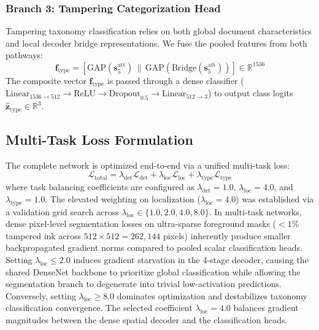 \documentclass[pdflatex,sn-mathphys-num,iicol]{sn-jnl}
\begin{document}
\subsubsection{Branch 3: Tampering Categorization Head}
Tampering taxonomy classification relies on both global document characteristics and local decoder bridge representations. We fuse the pooled features from both pathways:
\begin{equation}
\mathbf{f}_{\text{type}} = [\text{GAP}(\mathbf{s}_5^{\text{att}}) \,\|\, \text{GAP}(\text{Bridge}(\mathbf{s}_5^{\text{att}}))] \in \mathbb{R}^{1536}\label{eq_type_feat}
\end{equation}
The composite vector $\mathbf{f}_{\text{type}}$ is passed through a dense classifier ($\text{Linear}_{1536 \rightarrow 512} \rightarrow \text{ReLU} \rightarrow \text{Dropout}_{0.5} \rightarrow \text{Linear}_{512 \rightarrow 3}$) to output class logits $\hat{\mathbf{z}}_{\text{type}} \in \mathbb{R}^3$.

\subsection{Multi-Task Loss Formulation}\label{subsec4_5}
The complete network is optimized end-to-end via a unified multi-task loss:
\begin{equation}
\mathcal{L}_{\text{total}} = \lambda_{\text{det}} \mathcal{L}_{\text{det}} + \lambda_{\text{loc}} \mathcal{L}_{\text{loc}} + \lambda_{\text{type}} \mathcal{L}_{\text{type}}\label{eq_loss_total}
\end{equation}
where task balancing coefficients are configured as $\lambda_{\text{det}} = 1.0$, $\lambda_{\text{loc}} = 4.0$, and $\lambda_{\text{type}} = 1.0$. The elevated weighting on localization ($\lambda_{\text{loc}} = 4.0$) was established via a validation grid search across $\lambda_{\text{loc}} \in \{1.0, 2.0, 4.0, 8.0\}$. In multi-task networks, dense pixel-level segmentation losses on ultra-sparse foreground masks ($<1\%$ tampered ink across $512 \times 512 = 262{,}144$ pixels) inherently produce smaller backpropagated gradient norms compared to pooled scalar classification heads. Setting $\lambda_{\text{loc}} \le 2.0$ induces gradient starvation in the 4-stage decoder, causing the shared DenseNet backbone to prioritize global classification while allowing the segmentation branch to degenerate into trivial low-activation predictions. Conversely, setting $\lambda_{\text{loc}} \ge 8.0$ dominates optimization and destabilizes taxonomy classification convergence. The selected coefficient $\lambda_{\text{loc}} = 4.0$ balances gradient magnitudes between the dense spatial decoder and the classification heads.
\end{document}

